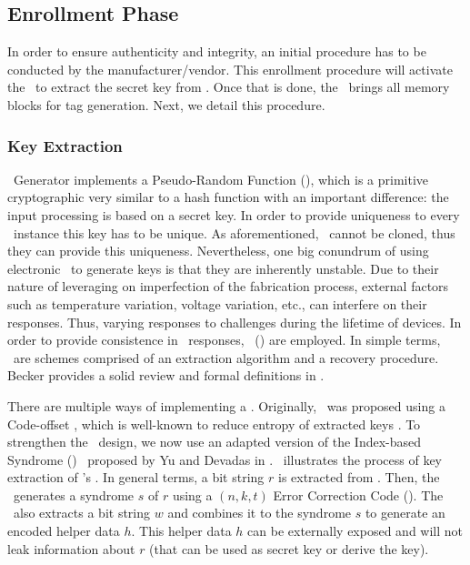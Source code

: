 \subsection{Enrollment Phase}
\label{subsec:Enrollment-Phase}

In order to ensure authenticity and integrity, an initial procedure has to be conducted by the manufacturer\slash{}vendor. This enrollment procedure will activate the \fuzzy~to extract the secret key from \pufs. Once that is done, the \handler~brings all memory blocks for tag generation. Next, we detail this procedure.

\subsubsection{Key Extraction}
\label{subsubsec:Key-Extraction}

\ptag~Generator implements a Pseudo-Random Function (\prf), which is a primitive cryptographic very similar to a hash function with an important difference: the input processing is based on a secret key. In order to provide uniqueness to every \cshia~instance this key has to be unique. As aforementioned, \pufs~cannot be cloned, thus they can provide this uniqueness. Nevertheless, one big conundrum of using electronic \pufs~to generate keys is that they are inherently unstable. Due to their nature of leveraging on imperfection of the fabrication process, external factors such as temperature variation, voltage variation, etc., can interfere on their responses. Thus, varying responses to challenges during the lifetime of devices. In order to provide consistence in \puf~responses, \fuzzy~(\fe) are employed. In simple terms, \fes~are schemes comprised of an extraction algorithm and a recovery procedure. Becker provides a solid review and formal definitions in \cite{Becker2017:RobustFuzzyExtractor}.

There are multiple ways of implementing a \fuzzy. Originally, \cshia~was proposed using a Code-offset \fe, which is well-known to reduce entropy of extracted keys \cite{Armknecht2011:Formalization}. To strengthen the \cshia~design, we now use an adapted version of the Index-based Syndrome (\ibs) \fe~proposed by Yu and Devadas in \cite{Yu2010:RobustErrorCorrection}. \fenroll~illustrates the process of key extraction of \cshia's \fe. In general terms, a bit string $r$ is extracted from \pufs. Then, the \fe~generates a syndrome $s$ of $r$ using a $(n,k,t)$ Error Correction Code (\ecc). The \fe~also extracts a bit string $w$ and combines it to the syndrome $s$ to generate an encoded helper data $h$. This helper data $h$ can be externally exposed and will not leak information about $r$ (that can be used as secret key or derive the key).


